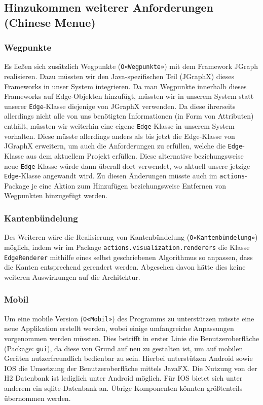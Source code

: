 \documentclass[enabledeprecatedfontcommands,fontsize=11pt,paper=a4,twoside]{scrartcl}
\newcounter{one}
\begin{document}
\subsection{Hinzukommen weiterer Anforderungen (Chinese Menue)}
\subsubsection{Wegpunkte}
Es ließen sich zusätzlich Wegpunkte (\texttt{O«Wegpunkte»}) mit dem Framework JGraph realisieren. Dazu müssten wir den Java-spezifischen Teil (JGraphX) dieses Frameworks in unser System integrieren. Da man Wegpunkte innerhalb dieses Frameworks auf Edge-Objekten hinzufügt, müssten wir in unserem System statt unserer \texttt{Edge}-Klasse diejenige von JGraphX verwenden. Da diese ihrerseits allerdings nicht alle von uns benötigten Informationen (in Form von Attributen) enthält, müssten wir weiterhin eine eigene \texttt{Edge}-Klasse in unserem System vorhalten. Diese müsste allerdings anders als bis jetzt die Edge-Klasse von JGraphX erweitern, um auch die Anforderungen zu erfüllen, welche die \texttt{Edge}-Klasse aus dem aktuellem Projekt erfüllen. Diese alternative beziehungsweise neue \texttt{Edge}-Klasse würde dann überall dort verwendet, wo aktuell unsere jetzige \texttt{Edge}-Klasse angewandt wird. Zu diesen Änderungen müsste auch im \texttt{actions}-Package je eine Aktion zum Hinzufügen beziehungsweise Entfernen von Wegpunkten hinzugefügt werden. \\

\subsubsection{Kantenbündelung}
Des Weiteren wäre die Realisierung von Kantenbündelung (\texttt{O«Kantenbündelung»}) möglich, indem wir im Package \texttt{actions.visualization.renderers} die Klasse \texttt{EdgeRenderer} mithilfe eines selbst geschriebenen Algorithmus so anpassen, dass die Kanten entsprechend gerendert werden. Abgesehen davon hätte dies keine weiteren Auswirkungen auf die Architektur.  \\

\subsubsection{Mobil}
Um eine mobile Version (\texttt{O«Mobil»}) des Programms zu unterstützen müsste eine neue Applikation erstellt werden, wobei einige umfangreiche Anpassungen vorgenommen werden müssten. Dies betrifft in erster Linie die Benutzeroberfläche (Package: \texttt{gui}), da diese von Grund auf neu zu gestalten ist, um auf mobilen Geräten nutzerfreundlich bedienbar zu sein. Hierbei unterstützen Android sowie IOS die Umsetzung der Benutzeroberfläche mittels JavaFX. Die Nutzung von der H2 Datenbank ist lediglich unter Android möglich. Für IOS bietet sich unter anderem ein sqlite-Datenbank an. Übrige Komponenten könnten größtenteils übernommen werden. 
\end{document}
